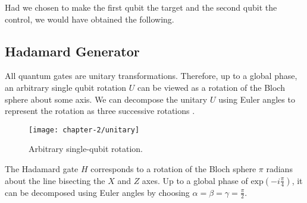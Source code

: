 Had we chosen to make the first qubit the target and the second qubit the control, we would have obtained the following.


\subsection{Hadamard Generator}

All quantum gates are unitary transformations. Therefore, up to a global phase, an arbitrary single qubit rotation $U$ can be viewed as a rotation of the Bloch sphere about some axis. We can decompose the unitary $U$ using Euler angles to represent the rotation as three successive rotations \cite{Wetering2020}.

\begin{figure}[H]
    \centering
    \texttt{[image: chapter-2/unitary]}
    \caption{Arbitrary single-qubit rotation.}
\end{figure}

The Hadamard gate $H$ corresponds to a rotation of the Bloch sphere $\pi$ radians about the line bisecting the $X$ and $Z$ axes. Up to a global phase of $\text{exp} \left(-i \frac{\pi}{4} \right)$, it can be decomposed using Euler angles by choosing $\alpha = \beta = \gamma = \frac{\pi}{2}$. 

